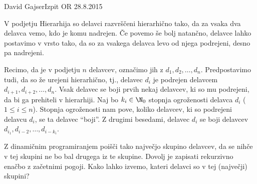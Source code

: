 \begin{naloga}{David Gajser}{Izpit OR 28.8.2015}
\begin{vprasanje}
V podjetju Hierarhija so delavci razvrščeni hierarhično tako,
da za vsaka dva delavca vemo, kdo je komu nadrejen.
Če povemo še bolj natančno, delavce lahko postavimo v vrsto tako,
da so za vsakega delavca levo od njega podrejeni, desno pa nadrejeni.

Recimo, da je v podjetju $n$ delavcev, označimo jih z $d_1, d_2, \dots, d_n$.
Predpostavimo tudi, da so že urejeni hierarhično,
tj., delavec $d_i$ je podrejen delavcem $d_{i+1}, d_{i+2}, \dots, d_n$.
Vsak delavec se boji prvih nekaj delavcev, ki so mu podrejeni,
da bi ga prehiteli v hierarhiji.
Naj bo $k_i \in \N_0$ stopnja ogroženosti delavca $d_i$ ($1 \le i \le n$).
Stopnja ogroženosti nam pove,
koliko delavcev, ki so podrejeni delavcu $d_i$, se ta delavec ``boji''.
Z drugimi besedami,
delavec $d_i$ se boji delavcev $d_{i_1}, d_{i-2}, \dots, d_{i-k_i}$.

Z dinamičnim programiranjem poišči tako največjo skupino delavcev,
da se nihče v tej skupini ne bo bal drugega iz te skupine.
Dovolj je zapisati rekurzivno enačbo z začetnimi pogoji.
Kako lahko izvemo, kateri delavci so v tej (največji) skupini?
\end{vprasanje}
\begin{odgovor}
\end{odgovor}
\end{naloga}

